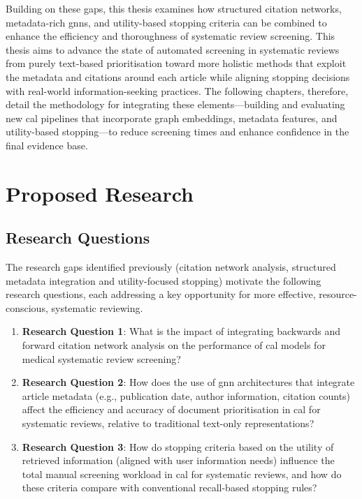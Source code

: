 \documentclass[10pt,oneside]{book}
\begin{document}
Building on these gaps, this thesis examines how structured citation networks, metadata-rich \glspl*{gnn}, and utility-based stopping criteria can be combined to enhance the efficiency and thoroughness of systematic review screening. This thesis aims to advance the state of automated screening in systematic reviews from purely text-based prioritisation toward more holistic methods that exploit the metadata and citations around each article while aligning stopping decisions with real-world information-seeking practices. The following chapters, therefore, detail the methodology for integrating these elements—building and evaluating new \gls*{cal} pipelines that incorporate graph embeddings, metadata features, and utility-based stopping—to reduce screening times and enhance confidence in the final evidence base.

\chapter{Proposed Research}\label{sec:Project_Overview}

\section{Research Questions}

The research gaps identified previously (citation network analysis, structured metadata integration and utility-focused stopping) motivate the following research questions, each addressing a key opportunity for more effective, resource-conscious, systematic reviewing.

\begin{enumerate}
    \item \textbf{Research Question 1}: What is the impact of integrating backwards and forward citation network analysis on the performance of \gls*{cal} models for medical systematic review screening?
    \item \textbf{Research Question 2}: How does the use of \gls*{gnn} architectures that integrate article metadata (e.g., publication date, author information, citation counts) affect the efficiency and accuracy of document prioritisation in \gls*{cal} for systematic reviews, relative to traditional text-only representations?
    \item \textbf{Research Question 3}: How do stopping criteria based on the utility of retrieved information (aligned with user information needs) influence the total manual screening workload in \gls*{cal} for systematic reviews, and how do these criteria compare with conventional recall-based stopping rules?
\end{enumerate}
\end{document}
